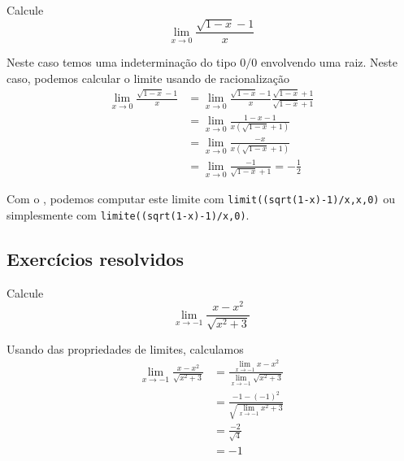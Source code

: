 \cleardoublepage\documentclass[../main.tex]{subfiles}
\begin{document}
\begin{ex}
  Calcule
  \begin{equation*}
    \lim_{x\to 0} \frac{\sqrt{1-x}-1}{x}
  \end{equation*}
  \begin{solution}
    Neste caso temos uma indeterminação do tipo $0/0$ envolvendo uma raiz. Neste caso, podemos calcular o limite usando de racionalização
  \begin{align*}
    \lim_{x\to 0} \frac{\sqrt{1-x}-1}{x} &= \lim_{x\to 0} \frac{\sqrt{1-x}-1}{x}\frac{\sqrt{1-x}+1}{\sqrt{1-x}+1}\\
                                         &= \lim_{x\to 0} \frac{1-x-1}{x(\sqrt{1-x}+1)} \\
                                         &= \lim_{x\to 0} \frac{-x}{x(\sqrt{1-x}+1)}\\
    &= \lim_{x\to 0} \frac{-1}{\sqrt{1-x}+1} = -\frac{1}{2}
  \end{align*}
  
  Com o \geogebra, podemos computar este limite com \verb+limit((sqrt(1-x)-1)/x,x,0)+ ou simplesmente com 
\verb+limite((sqrt(1-x)-1)/x,0)+.
  \end{solution}
 \end{ex}

\subsection{Exercícios resolvidos}

\begin{exeresol}
  Calcule
  \begin{equation*}
    \lim_{x\to -1} \frac{x - x^2}{\sqrt{x^2+3}}
  \end{equation*}
  \begin{resol}
  Usando das propriedades de limites, calculamos
  \begin{align*}
    \lim_{x\to -1} \frac{x-x^2}{\sqrt{x^2+3}} &= \frac{\displaystyle\lim_{x\to -1} x-x^2}{\displaystyle\lim_{x\to -1} \sqrt{x^2+3}} \\
                                              &= \frac{-1-(-1)^2}{\sqrt{\displaystyle\lim_{x\to -1} x^2+3}} \\
                                              &= \frac{-2}{\sqrt{4}} \\
                                              &= -1
  \end{align*}
\end{resol}
\end{exeresol}
\end{document}
